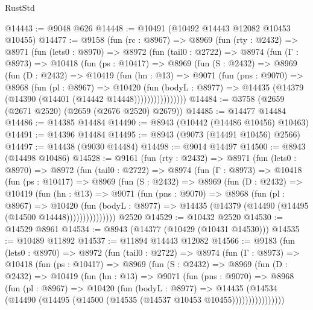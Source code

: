 \begin{lexlean}{RustStd}
\begin{coremodule}
{\begin{coremodule}
{{{{{{{{{{{{{{{{{{{{{{{{{{{{{{{{{{{{{{{@14443 := @9048 @626
@14448 := @10491 (@10492 @14443 @12082 @10453 @10455)
@14477 := @9158
    (fun (rc : @8967) =>
    @8969
      (fun (rty : @2432) =>
      @8971
        (fun (lets0 : @8970) =>
        @8972
          (fun (tail0 : @2722) =>
          @8974
            (fun (Γ : @8973) =>
            @10418
              (fun (ps : @10417) =>
              @8969
                (fun (S : @2432) =>
                @8969
                  (fun (D : @2432) =>
                  @10419
                    (fun (hn : @13) =>
                    @9071
                      (fun (pns : @9070) =>
                      @8968
                        (fun (pl : @8967) =>
                        @10420
                          (fun (bodyL : @8977) =>
                          @14435 (@14379 (@14390 (@14401 (@14442 @14448))))))))))))))))
@14484 := @3758 (@2659 (@2671 @2520) (@2659 (@2676 @2520) @2679))
@14485 := @14477 @14484
@14486 := @14385 @14484
@14490 := @8943 (@10442 (@14486 @10456) @10463)
@14491 := @14396 @14484
@14495 := @8943 (@9073 (@14491 @10456) @2566)
@14497 := @14438 (@9030 @14484)
@14498 := @9014 @14497
@14500 := @8943 (@14498 @10486)
@14528 := @9161
    (fun (rty : @2432) =>
    @8971
      (fun (lets0 : @8970) =>
      @8972
        (fun (tail0 : @2722) =>
        @8974
          (fun (Γ : @8973) =>
          @10418
            (fun (ps : @10417) =>
            @8969
              (fun (S : @2432) =>
              @8969
                (fun (D : @2432) =>
                @10419
                  (fun (hn : @13) =>
                  @9071
                    (fun (pns : @9070) =>
                    @8968
                      (fun (pl : @8967) =>
                      @10420
                        (fun (bodyL : @8977) =>
                        @14435 (@14379 (@14490 (@14495 (@14500 @14448)))))))))))))))
    @2520
@14529 := @10432 @2520
@14530 := @14529 @8961
@14534 := @8943 (@14377 (@10429 (@10431 @14530)))
@14535 := @10489 @11892
@14537 := @11894 @14443 @12082
@14566 := @9183
    (fun (lets0 : @8970) =>
    @8972
      (fun (tail0 : @2722) =>
      @8974
        (fun (Γ : @8973) =>
        @10418
          (fun (ps : @10417) =>
          @8969
            (fun (S : @2432) =>
            @8969
              (fun (D : @2432) =>
              @10419
                (fun (hn : @13) =>
                @9071
                  (fun (pns : @9070) =>
                  @8968
                    (fun (pl : @8967) =>
                    @10420
                      (fun (bodyL : @8977) =>
                      @14435
                        (@14534
                          (@14490 (@14495 (@14500 (@14535 (@14537 @10453 @10455))))))))))))))))
}}}}}}}}}}}}}}}}}}}}}}}}}}}}}}}}}}}}}}}
\end{coremodule}}
\end{coremodule}
\end{lexlean}
